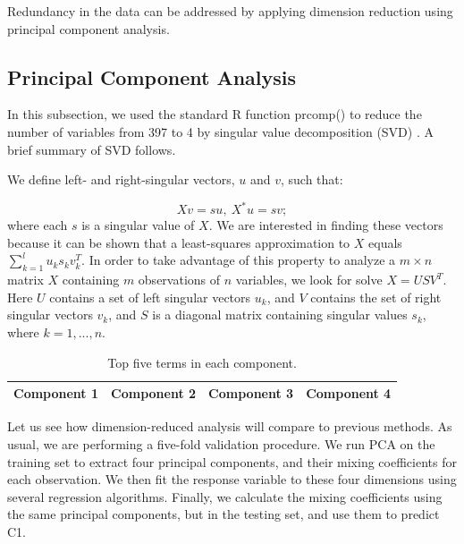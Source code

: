 Redundancy in the data can be addressed by applying dimension reduction using principal component analysis.
\subsection{Principal Component Analysis}
In this subsection, we used the standard R function prcomp() to reduce the number of variables from 397 to 4 by singular value decomposition (SVD) \cite{berrar}. A brief summary of SVD follows. 

We define left- and right-singular vectors, $u$ and $v$, such that:

\begin{equation}
Xv=su,~X^*u = sv;
\end{equation}
where each $s$ is a singular value of $X$. We are interested in finding these vectors because it can be shown that a least-squares approximation to $X$ equals $\sum_{k=1}^{l}u_ks_kv_k^T$. In order to take advantage of this property to analyze a $m\times n$ matrix $X$ containing $m$ observations of $n$ variables, we look for solve $X = USV^T$. Here $U$ contains a set of left singular vectors $u_k$, and $V$ contains the set of right singular vectors $v_k$, and $S$ is a diagonal matrix containing singular values $s_k$, where $k = 1, ..., n$. 

%


\begin{center}
\begin{table}[ht]
\begin{tabular}{l l l l}
\hline \hline
Component 1 & Component 2 &Component 3&Component 4\\ \hline 
\hline
\end{tabular}
\caption{Top five terms in each component.}
\label{components}
\end{table}
\end{center}

Let us see how dimension-reduced analysis will compare to previous methods. As usual, we are performing a five-fold validation procedure. We run PCA on the training set to extract four principal components, and their mixing coefficients for each observation. We then fit the response variable to these four dimensions using several regression algorithms. Finally, we calculate the mixing coefficients using the same principal components, but in the testing set, and use them to predict C1. 

